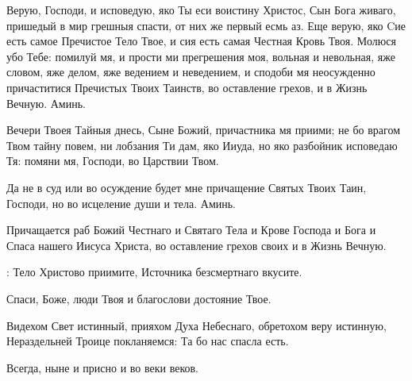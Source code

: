 \begin{mymulticols}

 Верую, Господи, и исповедую, яко Ты еси воистину Христос, Сын Бога живаго, пришедый в мир грешныя спасти, от них же первый есмь аз. Еще верую, яко Cие есть самое Пречистое Тело Твое, и сия есть самая Честная Кровь Твоя. Молюся убо Тебе: помилуй мя, и прости ми прегрешения моя, вольная и невольная, яже словом, яже делом, яже ведением и неведением, и сподоби мя неосужденно причаститися Пречистых Твоих Таинств, во оставление грехов, и в Жизнь Вечную. Аминь.

Вечери Твоея Тайныя днесь, Сыне Божий, причастника мя приими; не бо врагом Твом тайну повем, ни лобзания Ти дам, яко Ииуда, но яко разбойник исповедаю Тя: помяни мя, Господи, во Царствии Твом.

Да не в суд или во осуждение будет мне причащение Святых Твоих Таин, Господи, но во исцеление души и тела. Аминь.


 Причащается раб Божий  Честнаго и Святаго Тела и Крове Господа и Бога и Спаса нашего Иисуса Христа, во оставление грехов своих и в Жизнь Вечную. 

: Тело Христово приимите, Источника безсмертнаго вкусите.


 Спаси, Боже, люди Твоя и благослови достояние Твое.


 Видехом Свет истинный, прияхом Духа Небеснаго, обретохом веру истинную, Нераздельней Троице покланяемся: Та бо нас спасла есть.


 Всегда, ныне и присно и во веки веков.


\end{mymulticols}
